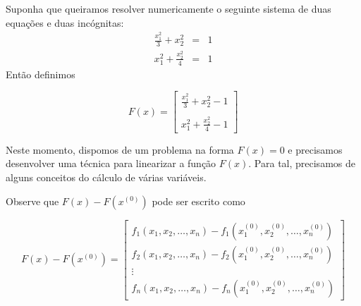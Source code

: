 \begin{ex} Suponha que queiramos resolver numericamente o seguinte sistema de duas equações e duas incógnitas:
\begin{eqnarray}
\frac{x_1^2}{3}+x_2^2&=&1\\
x_1^2+\frac{x_2^2}{4}&=&1
\end{eqnarray}
Então definimos

\begin{equation}F(x)=\left[
\begin{array}{c}
\frac{x_1^2}{3}+x_2^2-1\\~\\
x_1^2+\frac{x_2^2}{4}-1
\end{array}
\right]\end{equation}
\end{ex}
Neste momento, dispomos de um problema na forma $F(x)=0$ e precisamos desenvolver uma técnica para linearizar a função $F(x)$. Para tal, precisamos de alguns conceitos do cálculo de várias variáveis.

Observe que $F(x)-F(x^{(0)})$ pode ser escrito como

\begin{equation}F(x)-F(x^{(0)})=\left[
\begin{array}{c}
f_1(x_1,x_2,\ldots,x_n)-f_1(x_1^{(0)},x_2^{(0)},\ldots,x_n^{(0)})\\
f_2(x_1,x_2,\ldots,x_n)-f_2(x_1^{(0)},x_2^{(0)},\ldots,x_n^{(0)})\\
\vdots\\
f_n(x_1,x_2,\ldots,x_n)-f_n(x_1^{(0)},x_2^{(0)},\ldots,x_n^{(0)})
\end{array}
\right]\end{equation}

